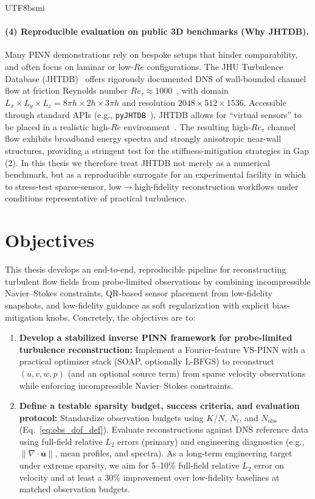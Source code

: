 \documentclass[master]{NTHUthesis}
\begin{document}
\begin{CJK*}{UTF8}{bsmi}
\paragraph{(4) Reproducible evaluation on public 3D benchmarks (Why JHTDB).}
Many PINN demonstrations rely on bespoke setups that hinder comparability, and often focus on laminar or low-$Re$ configurations. The JHU Turbulence Database (JHTDB)~\cite{Perlman2007SC} offers rigorously documented DNS of wall-bounded channel flow at friction Reynolds number $Re_\tau\!\approx\!1000$~\cite{Graham2016JoT, Lee2015JFM}, with domain $L_x\times L_y\times L_z=8\pi h\times2h\times3\pi h$ and resolution $2048\times512\times1536$. Accessible through standard APIs (e.g., \texttt{pyJHTDB}~\cite{pyJHTDB}), JHTDB allows for ``virtual sensors'' to be placed in a realistic high-$Re$ environment~\cite{Li2008JoT}. The resulting high-$Re_\tau$ channel flow exhibits broadband energy spectra and strongly anisotropic near-wall structures, providing a stringent test for the stiffness-mitigation strategies in Gap (2). In this thesis we therefore treat JHTDB not merely as a numerical benchmark, but as a reproducible surrogate for an experimental facility in which to stress-test sparse-sensor, low$\to$high-fidelity reconstruction workflows under conditions representative of practical turbulence.

\section{Objectives}
This thesis develops an end-to-end, reproducible pipeline for reconstructing turbulent flow fields from probe-limited observations by combining incompressible Navier--Stokes constraints, QR-based sensor placement from low-fidelity snapshots, and low-fidelity guidance as soft regularization with explicit bias-mitigation knobs. Concretely, the objectives are to:

\begin{enumerate}
    \item \textbf{Develop a stabilized inverse PINN framework for probe-limited turbulence reconstruction:}
    Implement a Fourier-feature VS-PINN with a practical optimizer stack (SOAP, optionally L-BFGS) to reconstruct $(u,v,w,p)$ (and an optional source term) from sparse velocity observations while enforcing incompressible Navier--Stokes constraints.

    \item \textbf{Define a testable sparsity budget, success criteria, and evaluation protocol:}
    Standardize observation budgets using $K/N$, $N_t$, and $N_{\text{obs}}$ (Eq.~\eqref{eq:obs_dof_def}). Evaluate reconstructions against DNS reference data using full-field relative $L_2$ errors (primary) and engineering diagnostics (e.g., $\|\nabla\cdot\mathbf{u}\|$, mean profiles, and spectra). As a long-term engineering target under extreme sparsity, we aim for 5--10\% full-field relative $L_2$ error on velocity and at least a 30\% improvement over low-fidelity baselines at matched observation budgets.


\end{enumerate}
\end{CJK*}
\end{document}
